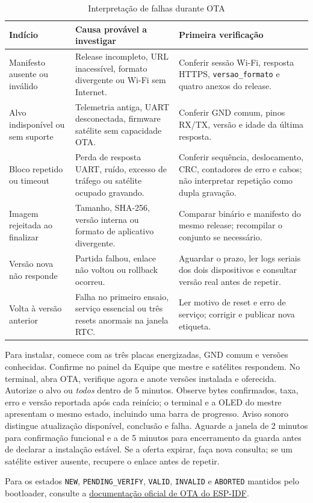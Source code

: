 \begin{table}[htbp]\centering\small
\caption{Interpretação de falhas durante OTA}\label{tab:falhas-ota}
\begin{tabularx}{\textwidth}{@{}l X X@{}}\toprule
Indício & Causa provável a investigar & Primeira verificação\\\midrule
Manifesto ausente ou inválido & Release incompleto, URL inacessível, formato divergente ou Wi-Fi sem Internet. & Conferir sessão Wi-Fi, resposta HTTPS, \texttt{versao\_formato} e quatro anexos do release.\\
Alvo indisponível ou sem suporte & Telemetria antiga, UART desconectada, firmware satélite sem capacidade OTA. & Conferir GND comum, pinos RX/TX, versão e idade da última resposta.\\
Bloco repetido ou timeout & Perda de resposta UART, ruído, excesso de tráfego ou satélite ocupado gravando. & Conferir sequência, deslocamento, CRC, contadores de erro e cabos; não interpretar repetição como dupla gravação.\\
Imagem rejeitada ao finalizar & Tamanho, SHA-256, versão interna ou formato de aplicativo divergente. & Comparar binário e manifesto do mesmo release; recompilar o conjunto se necessário.\\
Versão nova não responde & Partida falhou, enlace não voltou ou rollback ocorreu. & Aguardar o prazo, ler logs seriais dos dois dispositivos e consultar versão real antes de repetir.\\
Volta à versão anterior & Falha no primeiro ensaio, serviço essencial ou três resets anormais na janela RTC. & Ler motivo de reset e erro de serviço; corrigir e publicar nova etiqueta.\\\bottomrule
\end{tabularx}\end{table}

Para instalar, comece com as três placas energizadas, GND comum e versões conhecidas. Confirme no painel da Equipe que mestre e satélites respondem. No terminal, abra OTA, verifique agora e anote versões instalada e oferecida. Autorize o alvo ou \emph{todos} dentro de 5 minutos. Observe bytes confirmados, taxa, erro e versão reportada após cada reinício; o terminal e a OLED do mestre apresentam o mesmo estado, incluindo uma barra de progresso. Aviso sonoro distingue atualização disponível, conclusão e falha. Aguarde a janela de 2 minutos para confirmação funcional e a de 5 minutos para encerramento da guarda antes de declarar a instalação estável. Se a oferta expirar, faça nova consulta; se um satélite estiver ausente, recupere o enlace antes de repetir.

Para os estados \texttt{NEW}, \texttt{PENDING\_VERIFY}, \texttt{VALID}, \texttt{INVALID} e \texttt{ABORTED} mantidos pelo bootloader, consulte a \href{https://docs.espressif.com/projects/esp-idf/en/latest/esp32s3/api-reference/system/ota.html}{documentação oficial de OTA do ESP-IDF}.

